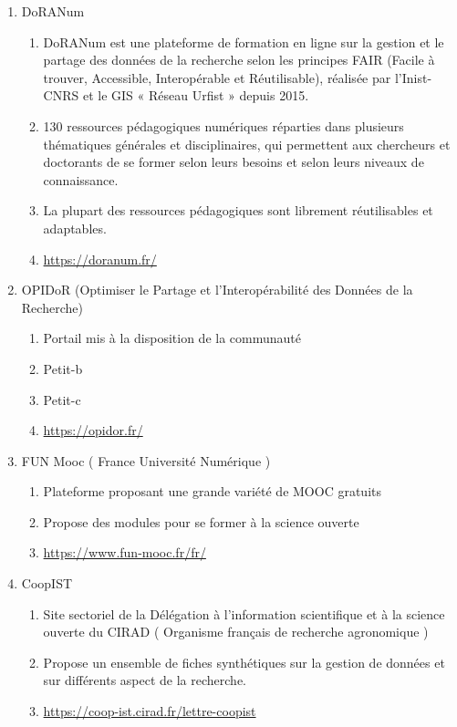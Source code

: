 \documentclass{book}
\begin{document}
\begin{enumerate}
	\item DoRANum
        \begin{enumerate}
            \item DoRANum est une plateforme de formation en ligne sur la gestion et le partage des données de la recherche selon les principes FAIR (Facile à trouver, Accessible, Interopérable et Réutilisable), réalisée par l’Inist-CNRS et le GIS « Réseau Urfist » depuis 2015.
            \item 130 ressources pédagogiques numériques réparties dans plusieurs thématiques générales et disciplinaires, qui permettent aux chercheurs et doctorants de se former selon leurs besoins et selon leurs niveaux de connaissance. 
            \item La plupart des ressources pédagogiques sont librement réutilisables et adaptables.
            \item \url{https://doranum.fr/}
        \end{enumerate}
	\item OPIDoR (Optimiser le Partage et l’Interopérabilité des Données de la Recherche)
        \begin{enumerate}
            \item Portail mis à la disposition de la communauté 
            \item Petit-b
            \item Petit-c
            \item \url{https://opidor.fr/}
        \end{enumerate}
	\item FUN Mooc ( France Université Numérique )
        \begin{enumerate}
            \item Plateforme proposant une grande variété de MOOC gratuits
            \item Propose des modules pour se former à la science ouverte
            \item \url{https://www.fun-mooc.fr/fr/}
        \end{enumerate}
    \item CoopIST
        \begin{enumerate}
            \item Site sectoriel de la Délégation à l'information scientifique et à la science ouverte du CIRAD ( Organisme français de recherche agronomique )
            \item Propose un ensemble de fiches synthétiques sur la gestion de données et sur différents aspect de la recherche. 
            \item \url{https://coop-ist.cirad.fr/lettre-coopist}
        \end{enumerate}


\end{enumerate}
\end{document}
